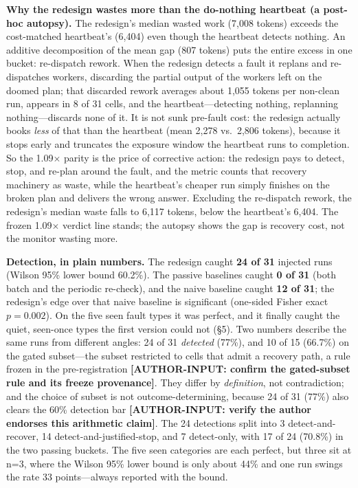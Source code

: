 \documentclass[acmsmall,screen]{acmart}
\begin{document}
\textbf{Why the redesign wastes more than the do-nothing heartbeat (a post-hoc autopsy).}
The redesign's median wasted work (7,008 tokens) exceeds the cost-matched heartbeat's
(6,404) even though the heartbeat detects nothing. An additive decomposition of the mean
gap (807 tokens) puts the entire excess in one bucket: re-dispatch rework. When the
redesign detects a fault it replans and re-dispatches workers, discarding the partial
output of the workers left on the doomed plan; that discarded rework averages about 1,055
tokens per non-clean run, appears in 8 of 31 cells, and the heartbeat---detecting nothing,
replanning nothing---discards none of it. It is not sunk pre-fault cost: the redesign
actually books \emph{less} of that than the heartbeat (mean 2,278 vs.\ 2,806 tokens),
because it stops early and truncates the exposure window the heartbeat runs to completion.
So the 1.09$\times$ parity is the price of corrective action: the redesign pays to detect,
stop, and re-plan around the fault, and the metric counts that recovery machinery as waste,
while the heartbeat's cheaper run simply finishes on the broken plan and delivers the wrong
answer. Excluding the re-dispatch rework, the redesign's median waste falls to 6,117 tokens,
below the heartbeat's 6,404. The frozen 1.09$\times$ verdict line stands; the autopsy shows
the gap is recovery cost, not the monitor wasting more.

\textbf{Detection, in plain numbers.} The redesign caught \textbf{24 of 31}
injected runs (Wilson 95\% lower bound 60.2\%). The passive baselines caught
\textbf{0 of 31} (both batch and the periodic re-check), and the naive baseline
caught \textbf{12 of 31}; the redesign's edge over that naive baseline is
significant (one-sided Fisher exact $p=0.002$). On the five seen fault types it
was perfect, and it finally caught the quiet, seen-once types the first version
could not (\S5). Two numbers describe the same runs from different angles: 24 of
31 \emph{detected} (77\%), and 10 of 15 (66.7\%) on the gated subset---the subset
restricted to cells that admit a recovery path, a rule frozen in the
pre-registration \textbf{[AUTHOR-INPUT: confirm the gated-subset rule and its
freeze provenance]}. They differ by \emph{definition}, not contradiction; and the
choice of subset is not outcome-determining, because 24 of 31 (77\%) also clears
the 60\% detection bar \textbf{[AUTHOR-INPUT: verify the author endorses this
arithmetic claim]}. The 24 detections split into 3 detect-and-recover, 14
detect-and-justified-stop, and 7 detect-only, with 17 of 24 (70.8\%) in the two
passing buckets. The five seen categories are each perfect, but three sit at
n=3, where the Wilson 95\% lower bound is only about 44\% and one run swings the
rate 33 points---always reported with the bound.
\end{document}
